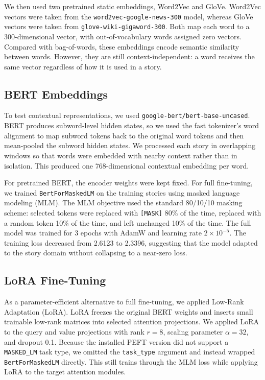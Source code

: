 \documentclass[11pt]{article}
\begin{document}
We then used two pretrained static embeddings, Word2Vec and GloVe. Word2Vec vectors were taken from the \texttt{word2vec-google-news-300} model, whereas GloVe vectors were taken from \texttt{glove-\allowbreak wiki-gigaword-300}. Both map each word to a 300-dimensional vector, with out-of-vocabulary words assigned zero vectors. Compared with bag-of-words, these embeddings encode semantic similarity between words. However, they are still context-independent: a word receives the same vector regardless of how it is used in a story.

\subsection{BERT Embeddings}
To test contextual representations, we used \texttt{google-bert/bert-base-uncased}. BERT produces subword-level hidden states, so we used the fast tokenizer's word alignment to map subword tokens back to the original word tokens and then mean-pooled the subword hidden states. We processed each story in overlapping windows so that words were embedded with nearby context rather than in isolation. This produced one 768-dimensional contextual embedding per word.

For pretrained BERT, the encoder weights were kept fixed. For full fine-tuning, we trained \texttt{BertForMaskedLM} on the training stories using masked language modeling (MLM). The MLM objective used the standard 80/10/10 masking scheme: selected tokens were replaced with \texttt{[MASK]} 80\% of the time, replaced with a random token 10\% of the time, and left unchanged 10\% of the time. The full model was trained for 3 epochs with AdamW and learning rate $2 \times 10^{-5}$. The training loss decreased from 2.6123 to 2.3396, suggesting that the model adapted to the story domain without collapsing to a near-zero loss.

\subsection{LoRA Fine-Tuning}
As a parameter-efficient alternative to full fine-tuning, we applied Low-Rank Adaptation (LoRA). LoRA freezes the original BERT weights and inserts small trainable low-rank matrices into selected attention projections. We applied LoRA to the query and value projections with rank $r=8$, scaling parameter $\alpha=32$, and dropout 0.1. Because the installed PEFT version did not support a \texttt{MASKED\_LM} task type, we omitted the \texttt{task\_type} argument and instead wrapped \texttt{BertForMaskedLM} directly. This still trains through the MLM loss while applying LoRA to the target attention modules.
\end{document}
